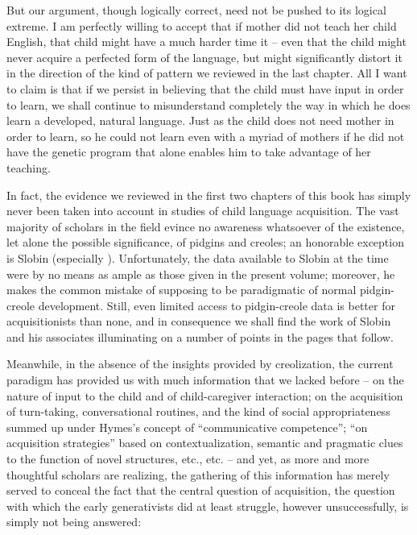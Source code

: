 But our argument, though logically correct, need not be pushed to its logical extreme. I am perfectly willing to accept that if mother did not teach her child English, that child might have a much harder time  it -- even that the child might never acquire a perfected form of the language, but might significantly distort it in the direction of the kind of pattern we reviewed in the last chapter. All I want to claim is that if we persist in believing that the child must have input in order to learn, we shall continue to misunderstand completely the way in which he does learn a developed, natural language. Just as
the child does not need mother in order to learn, so he could not learn even with a myriad of mothers if he did not have the genetic program that alone enables him to take advantage of her teaching.

In fact, the evidence we reviewed in the first two chapters of this book has simply never been taken into account in studies of child language acquisition. The vast majority of scholars in the field evince no awareness whatsoever of the existence, let alone the possible significance, of pidgins and creoles; an honorable exception is Slobin (especially \citealt{Slobin1977}). Unfortunately, the data available to Slobin at the time were by no means as ample as those given in the present volume; moreover, he makes the common mistake of supposing  to be paradigmatic of normal pidgin-creole development. Still, even limited access to pidgin-creole data is better for acquisitionists than none, and in consequence we shall find the work of Slobin and his associates illuminating on a number of points in the pages that follow.

Meanwhile, in the absence of the insights provided by creolization, the current paradigm has provided us with much information that we lacked before -- on the nature of input to the child and of child-caregiver interaction; on the acquisition of turn-taking, conversational routines, and the kind of social appropriateness summed up under Hymes's concept of ``communicative competence''; ``on acquisition strategies'' based on contextualization, semantic and pragmatic clues to the function of novel structures, etc., etc. -- and yet, as more and more thoughtful scholars are realizing, the gathering of this information has merely served to conceal the fact that the central question of acquisition, the question with which the early generativists did at least struggle, however unsuccessfully, is simply not being answered:

